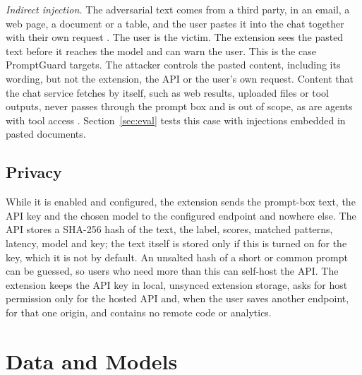 \documentclass[conference]{IEEEtran}
\begin{document}
\emph{Indirect injection.} The adversarial text comes from a third party, in an email, a web page, a
document or a table, and the user pastes it into the chat together with their own request
\cite{greshake2023not}. The user is the victim. The extension sees the pasted text before it reaches the
model and can warn the user. This is the case PromptGuard targets. The attacker controls the pasted
content, including its wording, but not the extension, the API or the user's own request. Content that
the chat service fetches by itself, such as web results, uploaded files or tool outputs, never passes
through the prompt box and is out of scope, as are agents with tool access \cite{willison2025trifecta}.
Section~\ref{sec:eval} tests this case with injections embedded in pasted documents.

\subsection{Privacy}
While it is enabled and configured, the extension sends the prompt-box text, the API key and the chosen
model to the configured endpoint and nowhere else. The API stores a SHA-256 hash of the text, the label,
scores, matched patterns, latency, model and key; the text itself is stored only if this is turned on
for the key, which it is not by default. An unsalted hash of a short or common prompt can be guessed, so
users who need more than this can self-host the API. The extension keeps the API key in local, unsynced
extension storage, asks for host permission only for the hosted API and, when the user saves another
endpoint, for that one origin, and contains no remote code or analytics.

\section{Data and Models}\label{sec:data}
\end{document}
